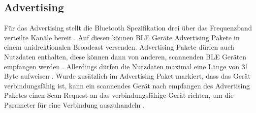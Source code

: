 \subsection{Advertising}
Für das Advertising stellt die Bluetooth Spezifikation drei über das Frequenzband verteilte Kanäle bereit \cite{blue2010channel}.
Auf diesen können BLE Geräte Advertising Pakete in einem unidrektionalen Broadcast versenden.
Advertising Pakete dürfen auch Nutzdaten enthalten, diese können dann von anderen, scannenden BLE Geräten empfangen werden \cite{blue2010advertising}.
Allerdings dürfen die Nutzdaten maximal eine Länge von 31 Byte aufweisen \cite{blue2010pdu}.
Wurde zusätzlich im Advertising Paket markiert, dass das Gerät verbindungsfähig ist, kann ein scannendes Gerät nach empfangen des Advertising Paketes einen Scan Request an das verbindungsfähige Gerät richten, um die Parameter für eine Verbindung auszuhandeln \cite{blue2010scanning}.


